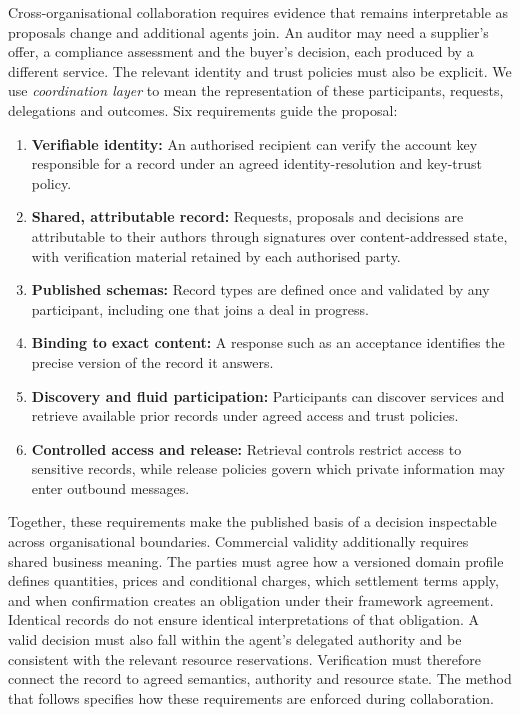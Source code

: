 Cross-organisational collaboration requires evidence that remains interpretable as proposals change and additional agents join. An auditor may need a supplier's offer, a compliance assessment and the buyer's decision, each produced by a different service. The relevant identity and trust policies must also be explicit. We use \emph{coordination layer} to mean the representation of these participants, requests, delegations and outcomes. Six requirements guide the proposal:
\begin{enumerate}[label=C\arabic*,leftmargin=*]
  \item \textbf{Verifiable identity:} An authorised recipient can verify the account key responsible for a record under an agreed identity-resolution and key-trust policy.
  \item \textbf{Shared, attributable record:} Requests, proposals and decisions are attributable to their authors through signatures over content-addressed state, with verification material retained by each authorised party.
  \item \textbf{Published schemas:} Record types are defined once and validated by any participant, including one that joins a deal in progress.
  \item \textbf{Binding to exact content:} A response such as an acceptance identifies the precise version of the record it answers.
  \item \textbf{Discovery and fluid participation:} Participants can discover services and retrieve available prior records under agreed access and trust policies.
  \item \textbf{Controlled access and release:} Retrieval controls restrict access to sensitive records, while release policies govern which private information may enter outbound messages.
\end{enumerate}
Together, these requirements make the published basis of a decision inspectable across organisational boundaries. Commercial validity additionally requires shared business meaning. The parties must agree how a versioned domain profile defines quantities, prices and conditional charges, which settlement terms apply, and when confirmation creates an obligation under their framework agreement. Identical records do not ensure identical interpretations of that obligation. A valid decision must also fall within the agent's delegated authority and be consistent with the relevant resource reservations. Verification must therefore connect the record to agreed semantics, authority and resource state.
The method that follows specifies how these requirements are enforced during collaboration.

